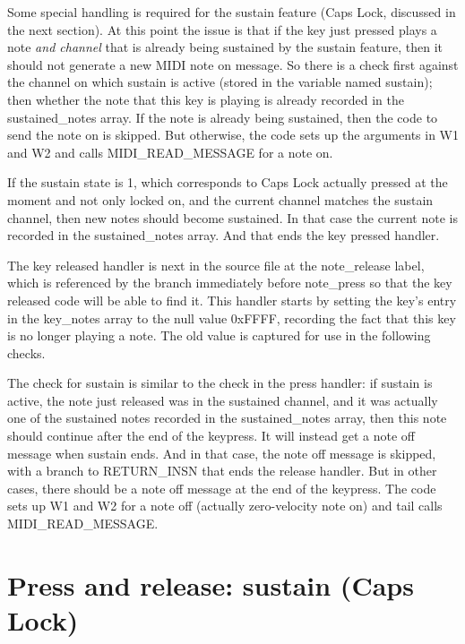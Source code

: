 Some special handling is required for the sustain feature (Caps Lock,
discussed in the next section).  At this point the issue is that if the key
just pressed plays a note \emph{and channel} that is already being sustained
by the sustain feature, then it should not generate a new MIDI note on
message.  So there is a check first against the channel on which sustain is
active (stored in the variable named sustain); then whether the note that
this key is playing is already recorded in the sustained\_notes array.  If
the note is already being sustained, then the code to send the note on is
skipped.  But otherwise, the code sets up the arguments in W1 and W2 and
calls MIDI\_READ\_MESSAGE for a note on.

If the sustain state is 1, which corresponds to Caps Lock actually pressed
at the moment and not only locked on, and the current channel matches the
sustain channel, then new notes should become sustained.  In that case the
current note is recorded in the sustained\_notes array.  And that ends the
key pressed handler.

The key released handler is next in the source file at the note\_release
label, which is referenced by the branch immediately before note\_press so
that the key released code will be able to find it.  This handler starts by
setting the key's entry in the key\_notes array to the null value 0xFFFF,
recording the fact that this key is no longer playing a note.  The old value
is captured for use in the following checks.

The check for sustain is similar to the check in the press handler:  if
sustain is active, the note just released was in the sustained channel, and
it was actually one of the sustained notes recorded in the sustained\_notes
array, then this note should continue after the end of the keypress.  It
will instead get a note off message when sustain ends.  And in that case,
the note off message is skipped, with a branch to RETURN\_INSN that ends the
release handler.  But in other cases, there should be a note off message at
the end of the keypress.  The code sets up W1 and W2 for a note off
(actually zero-velocity note on) and tail calls MIDI\_READ\_MESSAGE.

\section{Press and release:  sustain (Caps Lock)}

